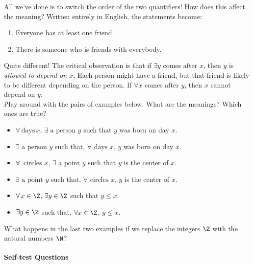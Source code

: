 \noindent All we've done is to switch the order of the two quantifiers! How does this affect the meaning? Written entirely in English, the statements become:
\begin{enumerate}
\item Everyone has at least one friend.
\item There is someone who is friends with everybody.
\end{enumerate}
Quite different! The critical observation is that if $\exists y$ comes after $x$, then $y$ is \emph{allowed to depend on $x$.} Each person might have a friend, but that friend is likely to be different depending on the person. If $\forall x$ comes after $y$, then $x$ cannot depend on $y$.\\

\noindent Play around with the pairs of examples below. What are the meanings? Which ones are true? 
\begin{itemize}\setlength{\itemsep}{0cm}
\item $\forall\,\text{days}\,x,\,\exists\text{ a person }y$ such that $y$ was born on day $x$.
\item $\exists\text{ a person }y$ such that, $\forall\text{ days }x$, $y$ was born on day $x$.\\
\item $\forall\,\text{ circles }x,\,\exists\text{ a point }y$ such that $y$ is the center of $x$.
\item $\exists\text{ a point }y$ such that, $\forall\text{ circles }x$, $y$ is the center of $x$.\\
\item $\forall\,x\in\Z,\,\exists y\in\Z$ such that $y\le x$.
\item $\exists y\in\Z$ such that, $\forall x\in\Z$, $y\le x$.
\end{itemize}
What happens in the last two examples if we replace the integers $\Z$ with the natural numbers $\N$?


\paragraph{Self-test Questions}

